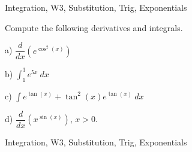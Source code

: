 \begin{tagblock}{Integration, W3, Substitution, Trig, Exponentials}
\begin{question}
	Compute the following derivatives and integrals.

\bigskip

a) $\dfrac d {dx} (e^{\cos^2(x)})$

\bigskip

b) $\displaystyle\int_1^3 e^{5x} \ dx$

\bigskip

c) $\displaystyle\int e^{\tan(x)}+\tan^2(x)e^{\tan(x)} \ dx$

\bigskip

d) $\dfrac d {dx} (x^{\sin(x)})$, $x>0$.
	
	
\begin{tags}
	    Integration, W3, Substitution, Trig, Exponentials
\end{tags}
	
\begin{diary}
	   
\end{diary}
	
\begin{solution}
	   
	    \end{enumerate}
\end{solution}
	
\end{question}

\end{tagblock}

